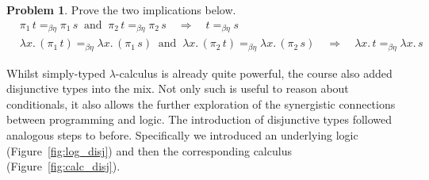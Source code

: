 \documentclass[a4paper, 11pt]{article}
\theoremstyle{definition}
\newtheorem{problem}{Problem}
\begin{document}
\begin{problem}
        Prove the two implications below.
        \begin{align*}
                & \pi_1 \, t =_{\beta \eta} \pi_1 \, s
                \> \text{ and } \> \pi_2 \, t =_{\beta \eta} \pi_2 \, s
                \quad \Longrightarrow \quad t =_{\beta \eta} s
                \\
                & \lambda x. \, (\pi_1 \, t) =_{\beta \eta} \lambda x. \, (\pi_1 \, s)
                \> \text{ and } \> 
                \lambda x. \, (\pi_2 \, t) =_{\beta \eta} \lambda x. \, (\pi_2 \, s)
                \quad \Longrightarrow \quad \lambda x. \, t =_{\beta \eta} \lambda x. \, s 
        \end{align*}
\end{problem}

Whilst simply-typed $\lambda$-calculus is already quite powerful, the course
also added disjunctive types into the mix. Not only such is useful to reason
about conditionals, it also allows the further exploration of the synergistic
connections between programming and logic. The introduction of disjunctive
types followed analogous steps to before. Specifically we introduced an
underlying logic (Figure~\ref{fig:log_disj}) and then the corresponding
calculus (Figure~\ref{fig:calc_disj}).
\end{document}
